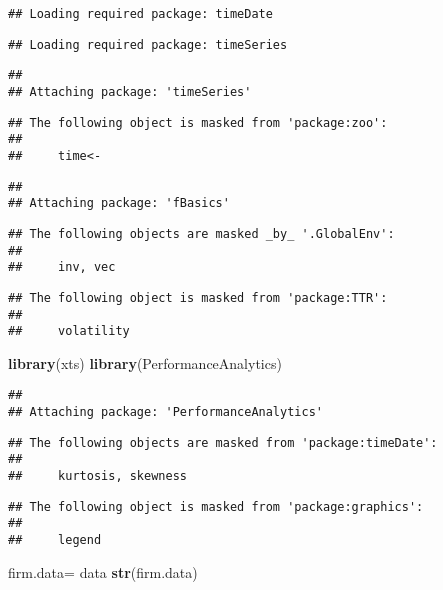 \documentclass[]{article}
\newenvironment{Shaded}{\begin{snugshade}}{\end{snugshade}}
\newcommand{\KeywordTok}[1]{\textcolor[rgb]{0.13,0.29,0.53}{\textbf{#1}}}
\newcommand{\NormalTok}[1]{#1}
\newcommand{\StringTok}[1]{\textcolor[rgb]{0.31,0.60,0.02}{#1}}
\begin{document}
\begin{verbatim}
## Loading required package: timeDate
\end{verbatim}

\begin{verbatim}
## Loading required package: timeSeries
\end{verbatim}

\begin{verbatim}
## 
## Attaching package: 'timeSeries'
\end{verbatim}

\begin{verbatim}
## The following object is masked from 'package:zoo':
## 
##     time<-
\end{verbatim}

\begin{verbatim}
## 
## Attaching package: 'fBasics'
\end{verbatim}

\begin{verbatim}
## The following objects are masked _by_ '.GlobalEnv':
## 
##     inv, vec
\end{verbatim}

\begin{verbatim}
## The following object is masked from 'package:TTR':
## 
##     volatility
\end{verbatim}

\begin{Shaded}
\begin{Highlighting}[]
\KeywordTok{library}\NormalTok{(xts)}
\KeywordTok{library}\NormalTok{(PerformanceAnalytics)}
\end{Highlighting}
\end{Shaded}

\begin{verbatim}
## 
## Attaching package: 'PerformanceAnalytics'
\end{verbatim}

\begin{verbatim}
## The following objects are masked from 'package:timeDate':
## 
##     kurtosis, skewness
\end{verbatim}

\begin{verbatim}
## The following object is masked from 'package:graphics':
## 
##     legend
\end{verbatim}

\begin{Shaded}
\begin{Highlighting}[]
\NormalTok{firm.data=}\StringTok{ }\NormalTok{data}
\KeywordTok{str}\NormalTok{(firm.data)}
\end{Highlighting}
\end{Shaded}
\end{document}
